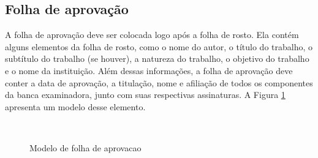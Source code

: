 \subsection{Folha de aprovação}

A folha de aprovação deve ser colocada logo após a folha de rosto. Ela contém alguns elementos da folha de rosto, como o nome do autor, o título do trabalho, o subtítulo do trabalho (se houver), a natureza do trabalho, o objetivo do trabalho e o nome da instituição. Além dessas informações, a folha de aprovação deve conter a data de aprovação, a titulação, nome e afiliação de todos os componentes da banca examinadora, junto com suas respectivas assinaturas. A Figura \ref{fig:aprovacao} apresenta um modelo desse elemento.

\begin{center}
\begin{figure}[H]
	\vspace*{0,1cm}
	\centering
	\caption{Modelo de folha de aprovacao}
    \label{fig:aprovacao}
    {}\\
\end{figure}
\end{center}

